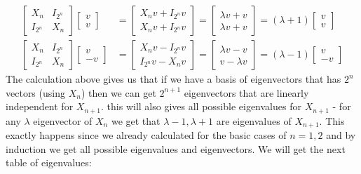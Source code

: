 \documentclass{article}
\begin{document}
\begin{align*}
\begin{bmatrix} X_n & I_{2^n} \\ I_{2^n} & X_n \end{bmatrix}  \begin{bmatrix} v \\ v \end{bmatrix} &= \begin{bmatrix} X_nv + I_{2^n}v \\ X_nv + I_{2^n}v \end{bmatrix} = \begin{bmatrix} \lambda v + v \\ \lambda v + v \end{bmatrix} = (\lambda+1)\begin{bmatrix}
v \\ v
\end{bmatrix} \\
\begin{bmatrix} X_n & I_{2^n} \\ I_{2^n} & X_n \end{bmatrix} \begin{bmatrix} v \\ -v \end{bmatrix} &= \begin{bmatrix} X_nv - I_{2^n}v \\ I_{2^n}v-X_nv \end{bmatrix} = \begin{bmatrix} \lambda v - v \\ v-\lambda v \end{bmatrix} = (\lambda-1)\begin{bmatrix}
v \\ -v
\end{bmatrix}
\end{align*}
The calculation above gives us that if we have a basis of eigenvectors that has $2^n$ vectors (using $X_n$) then we can get $2^{n+1}$ eigenvectors that are linearly independent for $X_{n+1}$. this will also gives all possible eigenvalues for $X_{n+1}$ - for any $\lambda$ eigenvector of $X_n$ we get that $\lambda-1,\lambda+1$ are eigenvalues of $X_{n+1}$. This exactly happens since we already calculated for the basic cases of $n=1,2$ and by induction we get all possible eigenvalues and eigenvectors. We will get the next table of eigenvalues:
\\ \\
\end{document}
